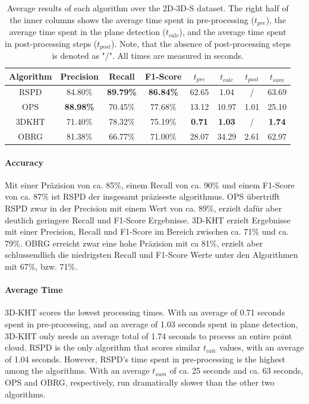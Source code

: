 \documentclass[main.tex]{subfiles}
\begin{document}
\begin{table}[H]
    \centering
    \begin{tabular}{c|cccccc|c}
        Algorithm & Precision        & Recall           & F1-Score         & $t_{pre}$     & $t_{calc}$    & $t_{post}$ & $t_{sum}$     \\ \hline
        RSPD      & 84.80\%          & \textbf{89.79\%} & \textbf{86.84\%} & 62.65         & 1.04          & /          & 63.69         \\
        OPS       & \textbf{88.98\%} & 70.45\%          & 77.68\%          & 13.12         & 10.97         & 1.01       & 25.10         \\
        3DKHT     & 71.40\%          & 78.32\%          & 75.19\%          & \textbf{0.71} & \textbf{1.03} & /          & \textbf{1.74} \\
        OBRG      & 81.38\%          & 66.77\%          & 71.00\%          & 28.07         & 34.29         & 2.61       & 62.97
    \end{tabular}
    \caption[Overall 2D-3D-S Results]{Average results of each algorithm over the 2D-3D-S dataset. The right half of the inner columns shows the average time spent in
        pre-processing ($t_{pre}$), the average time spent in the plane detection ($t_{calc}$), and the average time spent in post-processing steps ($t_{post}$).
        Note, that the absence of post-processing steps is denoted as "/". All times are measured in seconds.}
    \label{tab:res-3d2ds-total}
\end{table}

\paragraph{Accuracy}
Mit einer Präzision von ca. 85\%, einem Recall von ca. 90\% und einem F1-Score von ca. 87\% ist RSPD der insgesamt präziseste algorithmus.
OPS übertrifft RSPD zwar in der Precision mit einem Wert von ca. 89\%, erzielt dafür aber deutlich geringere Recall und F1-Score Ergebnisse.
3D-KHT erzielt Ergebnisse mit einer Precision, Recall und F1-Score im Bereich zwischen ca. 71\% und ca. 79\%.
OBRG erreicht zwar eine hohe Präzision mit ca 81\%, erzielt aber schlussendlich die niedrigsten Recall und F1-Score Werte unter den Algorithmen mit
67\%, bzw. 71\%.

\paragraph{Average Time }
\label{par:2D-3D-S-time}
3D-KHT scores the lowest processing times. With an average of 0.71 seconds spent in pre-processing, and an average of 1.03 seconds spent in plane detection,
3D-KHT only needs an average total of 1.74 seconds to process an entire point cloud. RSPD is the only algorithm that scores similar $t_{calc}$ values, with an
average of 1.04 seconds. However, RSPD's time spent in pre-processing is the highest among the algorithms.
With an average $t_{sum}$ of ca. 25 seconds and ca. 63 seconds, OPS and OBRG, respectively, run dramatically slower than the other two algorithms.
\end{document}

